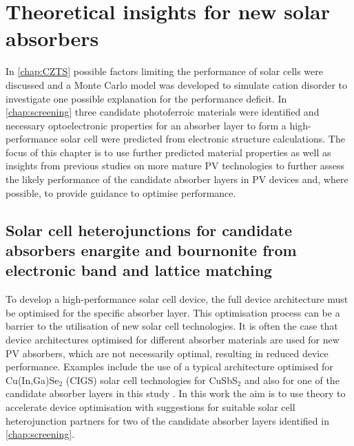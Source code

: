 \documentclass[11pt, twoside]{report}
\begin{document}
\chapter{Theoretical insights for new solar absorbers}\label{chap:insights}

In \autoref{chap:CZTS} possible factors limiting the performance of {\CZTS} solar cells were discussed and a Monte Carlo model was developed to simulate cation disorder to investigate one possible explanation for the performance deficit. In \autoref{chap:screening} three candidate photoferroic materials were identified and necessary optoelectronic properties for an absorber layer to form a high-performance solar cell were predicted from electronic structure calculations. The focus of this chapter is to use further predicted material properties as well as insights from previous studies on more mature PV technologies to further assess the likely performance of the candidate absorber layers in PV devices and, where possible, to provide guidance to optimise performance.


\section{Solar cell heterojunctions for candidate absorbers enargite
and bournonite from electronic band and lattice matching}\label{sulfosalt_band_alignment}

To develop a high-performance solar cell device, the full device architecture must be optimised for the specific absorber layer. This optimisation process can be a barrier to the utilisation of new solar cell technologies. It is often the case that device architectures optimised for different absorber materials are used for new PV absorbers, which are not necessarily optimal, resulting in reduced device performance. Examples include the use of a typical architecture optimised for Cu(In,Ga)Se$_2$ (CIGS) solar cell technologies for CuSbS$_2$ \cite{CAS_alignment} and also for one of the candidate absorber layers in this study {\enargite} \cite{enargite_SC}. In this work the aim is to use theory to accelerate device optimisation with suggestions for suitable solar cell heterojunction partners for two of the candidate absorber layers identified in \autoref{chap:screening}. 
\end{document}
